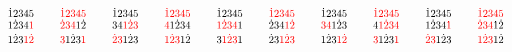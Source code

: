 \documentclass{article}
\begin{document}
\[
\SeqCompare{\dot{1}2345}{\SeqCompare{1\dot{2}34\textcolor{red}{1}}{1\dot{2}3\textcolor{red}{1}\textcolor{red}{\dot{2}}}}
\qquad
\SeqCompare{\textcolor{red}{\dot{1}}\textcolor{red}{2}\textcolor{red}{3}\textcolor{red}{4}\textcolor{red}{5}}{\SeqCompare{\textcolor{red}{\dot{2}}\textcolor{red}{3}\textcolor{red}{4}1\dot{2}}{\textcolor{red}{3}1\dot{2}3\textcolor{red}{1}}}
\qquad
\SeqCompare{\dot{1}2345}{\SeqCompare{34\textcolor{red}{1}\textcolor{red}{\dot{2}}\textcolor{red}{3}}{\textcolor{red}{\dot{2}}\textcolor{red}{3}1\dot{2}3}}
\qquad
\SeqCompare{\textcolor{red}{\dot{1}}\textcolor{red}{2}\textcolor{red}{3}\textcolor{red}{4}\textcolor{red}{5}}{\SeqCompare{\textcolor{red}{4}1\dot{2}34}{\textcolor{red}{1}\textcolor{red}{\dot{2}}\textcolor{red}{3}1\dot{2}}}
\qquad
\SeqCompare{\dot{1}2345}{\SeqCompare{\textcolor{red}{1}\textcolor{red}{\dot{2}}\textcolor{red}{3}\textcolor{red}{4}1}{3\textcolor{red}{1}\textcolor{red}{\dot{2}}\textcolor{red}{3}1}}
\qquad
\SeqCompare{\textcolor{red}{\dot{1}}\textcolor{red}{2}\textcolor{red}{3}\textcolor{red}{4}\textcolor{red}{5}}{\SeqCompare{\dot{2}34\textcolor{red}{1}\textcolor{red}{\dot{2}}}{\dot{2}3\textcolor{red}{1}\textcolor{red}{\dot{2}}\textcolor{red}{3}}}
\qquad
\SeqCompare{\dot{1}2345}{\SeqCompare{\textcolor{red}{3}\textcolor{red}{4}1\dot{2}3}{1\dot{2}3\textcolor{red}{1}\textcolor{red}{\dot{2}}}}
\qquad
\SeqCompare{\textcolor{red}{\dot{1}}\textcolor{red}{2}\textcolor{red}{3}\textcolor{red}{4}\textcolor{red}{5}}{\SeqCompare{4\textcolor{red}{1}\textcolor{red}{\dot{2}}\textcolor{red}{3}\textcolor{red}{4}}{\textcolor{red}{3}1\dot{2}3\textcolor{red}{1}}}
\qquad
\SeqCompare{\dot{1}2345}{\SeqCompare{1\dot{2}34\textcolor{red}{1}}{\textcolor{red}{\dot{2}}\textcolor{red}{3}1\dot{2}3}}
\qquad
\SeqCompare{\textcolor{red}{\dot{1}}\textcolor{red}{2}\textcolor{red}{3}\textcolor{red}{4}\textcolor{red}{5}}{\SeqCompare{\textcolor{red}{\dot{2}}\textcolor{red}{3}\textcolor{red}{4}1\dot{2}}{\textcolor{red}{1}\textcolor{red}{\dot{2}}\textcolor{red}{3}1\dot{2}}}
\]
\end{document}
